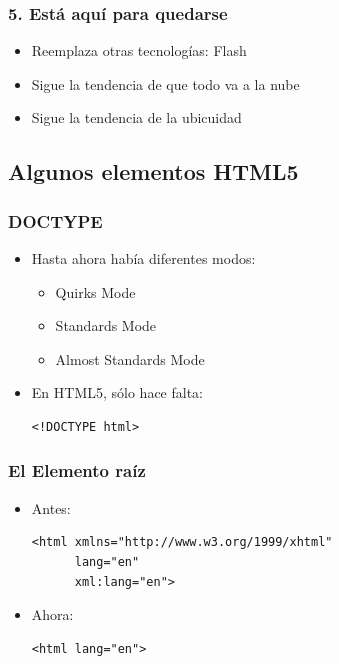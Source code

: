 \begin{frame}
\frametitle{5. Está aquí para quedarse}

\begin{itemize}
  \item Reemplaza otras tecnologías: Flash
  \item Sigue la tendencia de que todo va a la nube
  \item Sigue la tendencia de la ubicuidad
\end{itemize}

\end{frame}



\subsection{Algunos elementos HTML5}

\begin{frame}[fragile]
\frametitle{DOCTYPE}

\begin{itemize}
  \item Hasta ahora había diferentes modos:
  \begin{itemize}
    \item Quirks Mode
    \item Standards Mode
    \item Almost Standards Mode
  \end{itemize}
  \item En HTML5, sólo hace falta:
\begin{verbatim}
<!DOCTYPE html>
\end{verbatim}
\end{itemize}

\end{frame}


\begin{frame}[fragile]
\frametitle{El Elemento raíz}

\begin{itemize}
  \item Antes:
\begin{verbatim}
<html xmlns="http://www.w3.org/1999/xhtml"
      lang="en"
      xml:lang="en">
\end{verbatim}
  \item Ahora:
\begin{verbatim}
<html lang="en">
\end{verbatim}
\end{itemize}

\end{frame}

